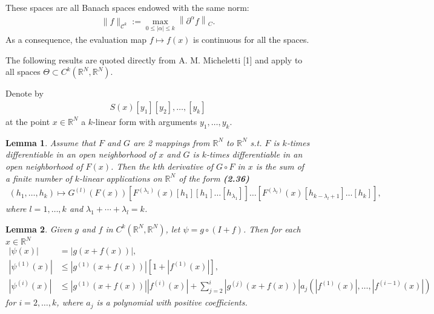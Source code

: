 \documentclass{book}
\numberwithin{equation}{section}
\newtheorem{lemma}{Lemma}[section]
\begin{document}
\begin{enumerate}
\begin{enumerate}
        These spaces are all Banach spaces endowed with the same norm:
        \begin{align*}
            \|f\|_{\mathcal{C}^k} := \max_{0\le\left|\alpha\right|\le k} \left\|\partial^\alpha f\right\|_C.
        \end{align*}
        As a consequence, the evaluation map $f\mapsto f(x)$ is continuous for all the spaces.
        
        The following results are quoted directly from A. M. Micheletti [1] and apply to all spaces $\Theta\subset C^k(\mathbb{R}^N,\mathbb{R}^N)$.
        
        Denote by
        \begin{align*}
            S(x)[y_1][y_2],\ldots,[y_k]
        \end{align*}
        at the point $x\in\mathbb{R}^N$ a $k$-linear form with arguments $y_1,\ldots,y_k$.
        
        \begin{lemma}
            Assume that $F$ and $G$ are 2 mappings from $\mathbb{R}^N$ to $\mathbb{R}^N$ s.t. $F$ is $k$-times differentiable in an open neighborhood of $x$ and $G$ is $k$-times differentiable in an open neighborhood of $F(x)$. Then the $k$th derivative of $G\circ F$ in $x$ is the sum of a finite number of $k$-linear applications on $\mathbb{R}^N$ of the form \textbf{(2.36)}
            \begin{align*}
                \left(h_1,\ldots,h_k\right)\mapsto G^{(l)}\left(F(x)\right)\left[F^{(\lambda_1)}(x)[h_1][h_1]\ldots[h_{\lambda_1}]\right]\ldots\left[F^{(\lambda_l)}(x)\left[h_{k - \lambda_l + 1}\right]\ldots[h_k]\right],
            \end{align*}
            where $l = 1,\ldots,k$ and $\lambda_1 + \cdots + \lambda_l = k$.
        \end{lemma}
    
        \begin{lemma}
            Given $g$ and $f$ in $C^k(\mathbb{R}^N,\mathbb{R}^N)$, let $\psi = g\circ(I + f)$. Then for each $x\in\mathbb{R}^N$
            \begin{align*}
                |\psi(x)| &= |g(x + f(x))|,\\
                |\psi^{(1)}(x)|&\le|g^{(1)}(x + f(x))|\left[1 + |f^{(1)}(x)|\right],\\
                |\psi^{(i)}(x)|&\le|g^{(1)}(x + f(x))||f^{(i)}(x)| + \sum_{j=2}^i |g^{(j)}(x + f(x))|a_j\left(|f^{(1)}(x)|,\ldots,|f^{(i-1)}(x)|\right)
            \end{align*}
            for $i = 2,\ldots,k$, where $a_j$ is a polynomial with positive coefficients.
        \end{lemma}
    

\end{enumerate}
\end{enumerate}
\end{document}
